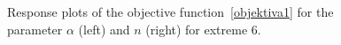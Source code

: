 \documentclass[review,times,3p,10pt]{elsarticle}
\begin{document}
\begin{figure}
\caption{Response plots of the objective function~\eqref{objektiva1} for the parameter $\alpha$ (left) and $n$ (right) for extreme 6.}
\label{objfnc6}
\end{figure}
\end{document}
